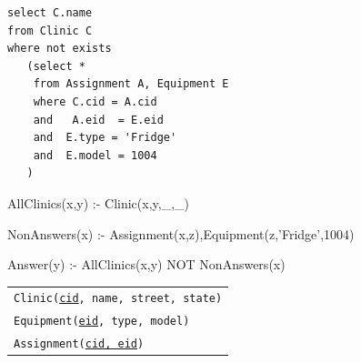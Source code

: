 \documentclass[addpoints,answers,12pt]{exam}
\begin{document}
\begin{questions}
\begin{parts}
\begin{verbatim}
select C.name
from Clinic C
where not exists
   (select * 
    from Assignment A, Equipment E
    where C.cid = A.cid 
    and   A.eid  = E.eid
    and  E.type = 'Fridge'
    and  E.model = 1004
   )
\end{verbatim}

\vfill

  \begin{solution}
AllClinics(x,y) :- Clinic(x,y,\_,\_)

NonAnswers(x)  :- Assignment(x,z),Equipment(z,'Fridge',1004)

Answer(y) :- AllClinics(x,y) NOT NonAnswers(x)
  \end{solution}





\newpage

{\scriptsize
\hfill
\begin{tabular}{l}
  \texttt{Clinic(\underline{cid}, name, street, state)} \\
  \texttt{Equipment(\underline{eid}, type, model)} \\
  \texttt{Assignment(\underline{cid, eid})} \\
\end{tabular}
}


\end{parts}
\end{questions}
\end{document}
